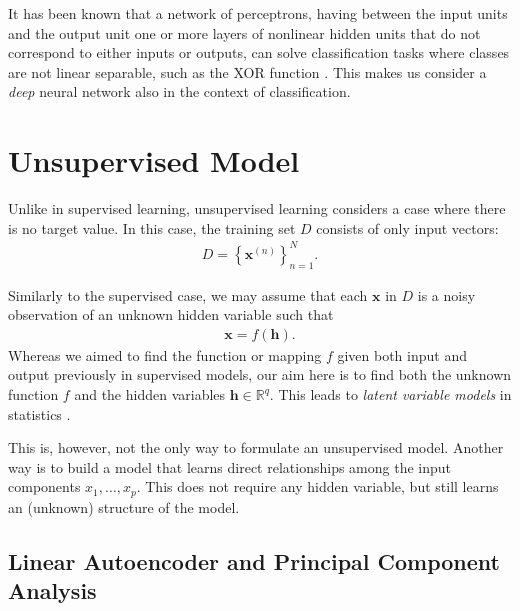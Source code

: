 \documentclass[dissertation,nocontribution]{aaltoseries}
\newcommand{\vect}[1]{\mathbf{#1}}
\newcommand{\vh}[0]{\vect{h}}
\newcommand{\vx}[0]{\vect{x}}
\newcommand{\RR}[0]{\mathbb{R}}
\begin{document}
It has been known that a network of perceptrons, having
between the input units and the output unit one or more
layers of nonlinear hidden units that do not correspond to
either inputs or outputs, can solve classification tasks
where classes are not linear separable, such as the XOR
function \citep[see, e.g.,][]{Touretzky1989}. This makes us
consider a \textit{deep} neural network also in the context
of classification.




\section{Unsupervised Model}
\label{sec:unsupervised_model}

Unlike in supervised learning, unsupervised learning
considers a case where there is no target value. 
In this case, the training set $D$ consists of only input
vectors:
\begin{align}
    \label{eq:unsup_train}
    D=\left\{ \vx^{(n)} \right\}_{n=1}^N.
\end{align}

Similarly to the supervised case, we may assume that each
$\vx$ in $D$ is a noisy observation of an unknown hidden
variable such that
\begin{align}
    \label{eq:lvm}
    \vx = f(\vh). %
\end{align}
Whereas we aimed
to find the function or mapping $f$ given both input and
output previously in supervised models, our aim here is to
find both the unknown function $f$ and the hidden variables
$\vh \in \RR^q$. This leads to \textit{latent variable
models} in statistics \citep[see, e.g.,][]{Murphy2012}.

This is, however, not the only way to formulate an
unsupervised model. Another way is to build a model that
learns direct relationships among the input components $x_1,
\dots, x_p$. This does not require any hidden variable, but
still learns an (unknown) structure of the model.


\subsection{Linear Autoencoder and Principal Component Analysis}
\label{sec:linear_autoencoder}
\end{document}
